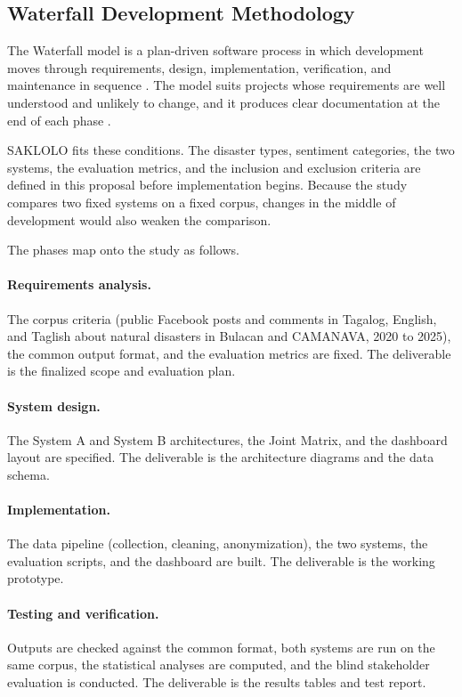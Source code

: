 \documentclass[12pt,a4paper]{report}
\begin{document}
\subsection{Waterfall Development Methodology}

The Waterfall model is a plan-driven software process in which development
moves through requirements, design, implementation, verification, and
maintenance in sequence \parencite{sommerville2016}. The model suits projects whose requirements are well
understood and unlikely to change, and it produces clear documentation at the
end of each phase \parencite{pressman2020}.

SAKLOLO fits these conditions. The disaster types, sentiment categories, the
two systems, the evaluation metrics, and the inclusion and exclusion criteria
are defined in this proposal before implementation begins. Because the study
compares two fixed systems on a fixed corpus, changes in the middle of
development would also weaken the comparison.

The phases map onto the study as follows.

\paragraph{Requirements analysis.} The corpus criteria (public Facebook posts
and comments in Tagalog, English, and Taglish about natural disasters in
Bulacan and CAMANAVA, 2020 to 2025), the common output format, and the
evaluation metrics are fixed. The deliverable is the finalized scope and
evaluation plan.

\paragraph{System design.} The System A and System B architectures, the Joint
Matrix, and the dashboard layout are specified. The deliverable is the
architecture diagrams and the data schema.

\paragraph{Implementation.} The data pipeline (collection, cleaning,
anonymization), the two systems, the evaluation scripts, and the dashboard are
built. The deliverable is the working prototype.

\paragraph{Testing and verification.} Outputs are checked against the common
format, both systems are run on the same corpus, the statistical analyses are
computed, and the blind stakeholder evaluation is conducted. The deliverable is
the results tables and test report.
\end{document}
